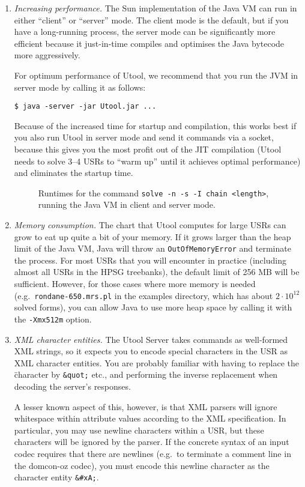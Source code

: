 \begin{enumerate}
\item \textit{Increasing performance.} The Sun implementation of the
Java VM can run in either ``client'' or ``server'' mode. The client
mode is the default, but if you have a long-running process, the
server mode can be significantly more efficient because it
just-in-time compiles and optimises the Java bytecode more
aggressively.

For optimum performance of Utool, we recommend that you run the JVM in
server mode by calling it as follows:
\begin{verbatim}
$ java -server -jar Utool.jar ...
\end{verbatim}

Because of the increased time for startup and compilation, this works
best if you also run Utool in server mode and send it commands via a
socket, because this gives you the most profit out of the JIT
compilation (Utool needs to solve 3--4 USRs to ``warm up'' until it
achieves optimal performance) and eliminates the startup time.

\begin{figure}
\begin{center}
\end{center}
\caption{Runtimes for the command \texttt{solve -n -s -I chain
<length>}, running the Java VM in client and server
mode. \label{fig:chains-server-client}}
\end{figure}


\item \textit{Memory consumption.} The chart that Utool computes for
large USRs can grow to eat up quite a bit of your memory. If it grows
larger than the heap limit of the Java VM, Java will throw an
\verb?OutOfMemoryError? and terminate the process. For most USRs that
you will encounter in practice (including almost all USRs in the HPSG
treebanks), the default limit of 256 MB will be sufficient. However,
for those cases where more memory is needed (e.g.\
\verb?rondane-650.mrs.pl? in the examples directory, which has about
$2 \cdot 10^{12}$ solved forms), you can allow Java to use more heap
space by calling it with the \verb?-Xmx512m? option.

\item \textit{XML character entities.} The Utool Server takes commands
as well-formed XML strings, so it expects you to encode special
characters in the USR as XML character entities. You are probably
familiar with having to replace the \" character by \verb?&quot;?
etc., and performing the inverse replacement when decoding the
server's responses.

A lesser known aspect of this, however, is that XML parsers will
ignore whitespace within attribute values according to the XML
specification. In particular, you may use newline characters within a
USR, but these characters will be ignored by the parser. If the
concrete syntax of an input codec requires that there are newlines
(e.g.\ to terminate a comment line in the domcon-oz codec), you must
encode this newline character as the character entity \verb?&#xA;?.
\end{enumerate}




